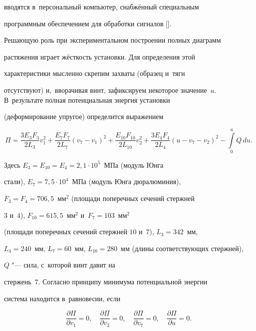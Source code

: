 вводятся в~персональный компьютер, снабжённый специальным

программным обеспечением для обработки сигналов [].



Решающую роль при экспериментальном построении полных диаграмм

растяжения играет жёсткость установки. Для определения этой

характеристики мысленно скрепим захваты (образец и~тяги

отсутствуют) и,~вворачивая винт, зафиксируем некоторое значение~$u$. В~результате полная потенциальная энергия установки

(деформирование упругое) определится выражением 

$$

\Pi=\frac{3E_{3}F_{3}}{2L_{3}}v^{2}_{1}+

\frac{E_{7}F_{7}}{2L_{7}}(v_{7}-v_{1})^{2}+

\frac{E_{10}F_{10}}{2L_{10}}v^{2}_{2}+

\frac{3E_{4}F_{4}}{2L_{4}}(u-v_{7}-v_{2})^{2}- \int

\limits_{0}^{u} Q\, du.

$$

Здесь $E_{3}=E_{10}=E_{4}=2{,}1 \cdot 10^{5}$~МПа (модуль Юнга

стали), $E_{7}=7{,}5 \cdot 10^{4}$~МПа (модуль Юнга дюралюминия),

$F_{3}=F_{4}=706{,}5$~мм$^{2}$ (площади поперечных сечений стержней

$3$ и~$4$), $F_{10}=615{,}5$~мм$^{2}$ и~$F_{7}=103$~мм$^{2}$

(площади поперечных сечений стержней $10$ и~$7$), $L_{3}=342$~мм,

$L_{4}=240$~мм, $L_{7}=60$~мм, $L_{10}=280$~мм (длины соответствующих стержней), 

$Q$ "--- сила, с~которой винт давит на

стержень~$7$. Согласно принципу минимума потенциальной энергии

система находится в~равновесии, если

\begin{equation}\label{mystruzu:eq2}

\frac{\partial \Pi}{\partial v_{1}}=0,\quad \frac{\partial

\Pi}{\partial v_{2}}=0,\quad \frac{\partial \Pi}{\partial v_{7}}=0,\quad

\frac{\partial \Pi}{\partial u}=0.

\end{equation}

